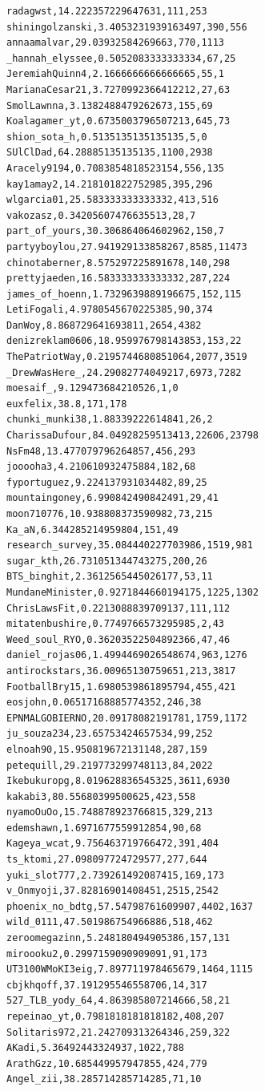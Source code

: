\begin{verbatim}
radagwst,14.222357229647631,111,253
shiningolzanski,3.4053231939163497,390,556
annaamalvar,29.03932584269663,770,1113
_hannah_elyssee,0.5052083333333334,67,25
JeremiahQuinn4,2.1666666666666665,55,1
MarianaCesar21,3.7270992366412212,27,63
SmolLawnna,3.1382488479262673,155,69
Koalagamer_yt,0.6735003796507213,645,73
shion_sota_h,0.5135135135135135,5,0
SUlClDad,64.28885135135135,1100,2938
Aracely9194,0.7083854818523154,556,135
kay1amay2,14.218101822752985,395,296
wlgarcia01,25.583333333333332,413,516
vakozasz,0.34205607476635513,28,7
part_of_yours,30.306864064602962,150,7
partyyboylou,27.941929133858267,8585,11473
chinotaberner,8.575297225891678,140,298
prettyjaeden,16.583333333333332,287,224
james_of_hoenn,1.7329639889196675,152,115
LetiFogali,4.9780545670225385,90,374
DanWoy,8.868729641693811,2654,4382
denizreklam0606,18.959976798143853,153,22
ThePatriotWay,0.2195744680851064,2077,3519
_DrewWasHere_,24.29082774049217,6973,7282
moesaif_,9.129473684210526,1,0
euxfelix,38.8,171,178
chunki_munki38,1.88339222614841,26,2
CharissaDufour,84.04928259513413,22606,23798
NsFm48,13.477079796264857,456,293
jooooha3,4.210610932475884,182,68
fyportuguez,9.224137931034482,89,25
mountaingoney,6.990842490842491,29,41
moon710776,10.938808373590982,73,215
Ka_aN,6.344285214959804,151,49
research_survey,35.084440227703986,1519,981
sugar_kth,26.731051344743275,200,26
BTS_binghit,2.3612565445026177,53,11
MundaneMinister,0.9271844660194175,1225,1302
ChrisLawsFit,0.2213088839709137,111,112
mitatenbushire,0.7749766573295985,2,43
Weed_soul_RYO,0.36203522504892366,47,46
daniel_rojas06,1.4994469026548674,963,1276
antirockstars,36.00965130759651,213,3817
FootballBry15,1.6980539861895794,455,421
eosjohn,0.06517168885774352,246,38
EPNMALGOBIERNO,20.09178082191781,1759,1172
ju_souza234,23.65753424657534,99,252
elnoah90,15.950819672131148,287,159
petequill,29.219773299748113,84,2022
Ikebukuropg,8.019628836545325,3611,6930
kakabi3,80.55680399500625,423,558
nyamoOuOo,15.748878923766815,329,213
edemshawn,1.6971677559912854,90,68
Kageya_wcat,9.756463719766472,391,404
ts_ktomi,27.098097724729577,277,644
yuki_slot777,2.739261492087415,169,173
v_Onmyoji,37.82816901408451,2515,2542
phoenix_no_bdtg,57.54798761609907,4402,1637
wild_0111,47.501986754966886,518,462
zeroomegazinn,5.248180494905386,157,131
miroooku2,0.2997159090909091,91,173
UT3100WMoKI3eig,7.897711978465679,1464,1115
cbjkhqoff,37.191295546558706,14,317
527_TLB_yody_64,4.863985807214666,58,21
repeinao_yt,0.7981818181818182,408,207
Solitaris972,21.242709313264346,259,322
AKadi,5.36492443324937,1022,788
ArathGzz,10.685449957947855,424,779
Angel_zii,38.285714285714285,71,10

\end{verbatim}
